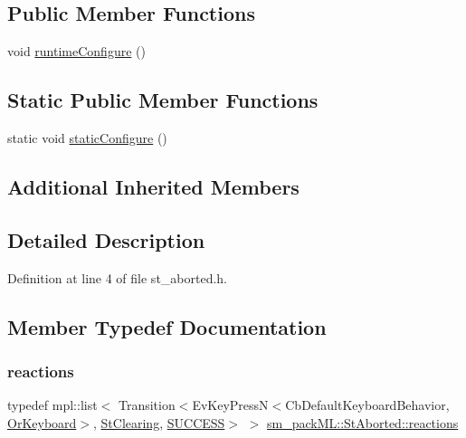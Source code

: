\subsection*{Public Member Functions}
\begin{DoxyCompactItemize}
\item 
void \hyperlink{structsm__packML_1_1StAborted_ac10c7a9d4b4e58196324d1cbbbe3497a}{runtime\+Configure} ()
\end{DoxyCompactItemize}
\subsection*{Static Public Member Functions}
\begin{DoxyCompactItemize}
\item 
static void \hyperlink{structsm__packML_1_1StAborted_ad9fe492ea5bd5c903ffba9ed612a084d}{static\+Configure} ()
\end{DoxyCompactItemize}
\subsection*{Additional Inherited Members}


\subsection{Detailed Description}


Definition at line 4 of file st\+\_\+aborted.\+h.



\subsection{Member Typedef Documentation}
\mbox{\label{structsm__packML_1_1StAborted_a0f84557ee52843d034a9672c0741bc89}} 
\subsubsection{\texorpdfstring{reactions}{reactions}}
{\footnotesize\ttfamily typedef mpl\+::list$<$ Transition$<$Ev\+Key\+PressN$<$Cb\+Default\+Keyboard\+Behavior, \hyperlink{classsm__packML_1_1OrKeyboard}{Or\+Keyboard}$>$, \hyperlink{structsm__packML_1_1StClearing}{St\+Clearing}, \hyperlink{classSUCCESS}{S\+U\+C\+C\+E\+SS}$>$ $>$ \hyperlink{structsm__packML_1_1StAborted_a0f84557ee52843d034a9672c0741bc89}{sm\+\_\+pack\+M\+L\+::\+St\+Aborted\+::reactions}}



